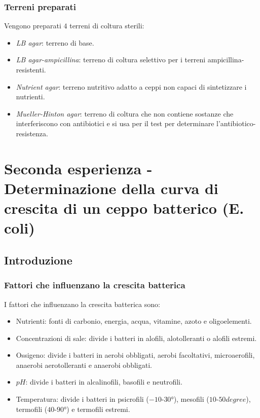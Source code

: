 		\subsubsection{Terreni preparati}
		Vengono preparati $4$ terreni di coltura sterili:
		\begin{multicols}{2}
			\begin{itemize}
				\item \emph{LB agar}: terreno di base.
				\item \emph{LB agar-ampicillina}: terreno di coltura selettivo per i terreni ampicillina-resistenti.
				\item \emph{Nutrient agar}: terreno nutritivo adatto a ceppi non capaci di sintetizzare i nutrienti.
				\item \emph{Mueller-Hinton agar}: terreno di coltura che non contiene sostanze che interferiscono con antibiotici e si usa per il test per determinare l'antibiotico-resistenza.
			\end{itemize}
		\end{multicols}
\section{Seconda esperienza - Determinazione della curva di crescita di un ceppo batterico (E. coli)}
	
	\subsection{Introduzione}

		\subsubsection{Fattori che influenzano la crescita batterica}
		I fattori che influenzano la crescita batterica sono:
		\begin{multicols}{2}
			\begin{itemize}
				\item Nutrienti: fonti di carbonio, energia, acqua, vitamine, azoto e oligoelementi.
				\item Concentrazioni di sale: divide i batteri in alofili, alotolleranti o alofili estremi.
				\item Ossigeno: divide i batteri in aerobi obbligati, aerobi facoltativi, microaerofili, anaerobi aerotolleranti e anaerobi obbligati.
				\item $pH$: divide i batteri in alcalinofili, basofili e neutrofili.
				\item Temperatura: divide i batteri in psicrofili ($-10$-$30\si{\degree}$), mesofili ($10$-$50\si{degree}$), termofili ($40$-$90\si{\degree}$) e termofili estremi.
			\end{itemize}
		\end{multicols}

